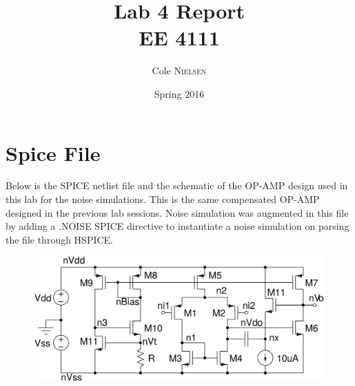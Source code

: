 \documentclass[12pt]{article}
\title{Lab 4 Report\\ \vspace{0.3 in} EE 4111}
\author{Cole \textsc{Nielsen}}
\date{Spring 2016}
\begin{document}
\maketitle 
\pagebreak
\section*{Spice File}
Below is the SPICE netlist file and the schematic of the OP-AMP design used in this lab for the noise simulations. This is the same compensated OP-AMP designed in the previous lab sessions. Noise simulation was augmented in this file by adding a .NOISE SPICE directive to instantiate a noise simulation on parsing the file through HSPICE.
\FloatBarrier
\begin{figure}[h!]
\begin{center}
 \includegraphics[scale=0.14]{./schem.png}
\end{center}
\end{figure}
\FloatBarrier
\end{document}
